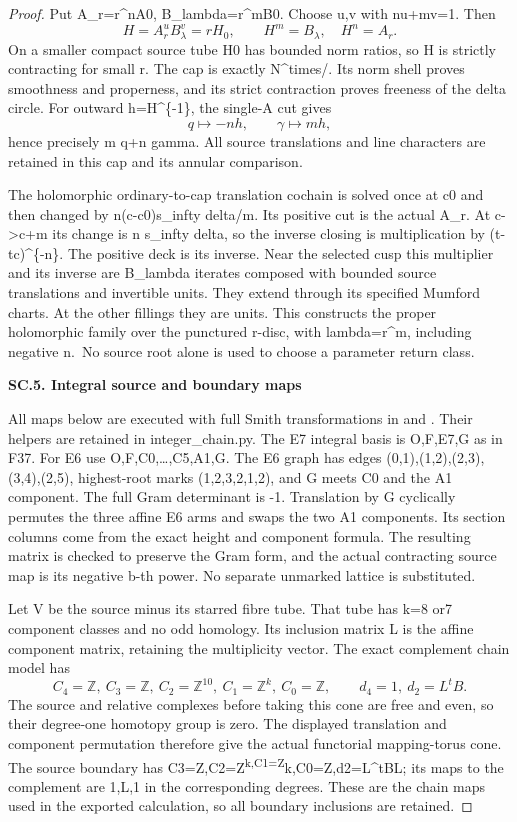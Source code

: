 \begin{proof}
Put A\_r=r\^{}nA0, B\_lambda=r\^{}mB0. Choose u,v with nu+mv=1.
Then
\[
 H=A_r^uB_\lambda^v=rH_0,\qquad H^m=B_\lambda,\quad H^n=A_r.
\]
On a smaller compact source tube H0 has bounded norm ratios, so
H is strictly contracting for small \textbar r\textbar. The cap is exactly
N\^{}times/. Its norm shell proves smoothness and properness,
and its strict contraction proves freeness of the delta circle.
For outward h=H\^{}\{-1\}, the single-A cut gives
\[
                         q\mapsto-nh,\qquad\gamma\mapsto mh,
\]
hence precisely m q+n gamma. All source translations and line
characters are retained in this cap and its annular comparison.

The holomorphic ordinary-to-cap translation cochain is solved
once at c0 and then changed by n(c-c0)s\_infty delta/m.
Its positive cut is the actual A\_r. At c-\textgreater c+m its change is
n s\_infty delta, so the inverse closing is multiplication by
(t-tc)\^{}\{-n\}. The positive deck is its inverse. Near the selected
cusp this multiplier and its inverse are B\_lambda iterates
composed with bounded source translations and invertible units.
They extend through its specified Mumford charts. At the other
fillings they are units. This constructs the proper holomorphic
family over the punctured r-disc, with lambda=r\^{}m, including
negative n.~No source root alone is used to choose a parameter
return class.

\par

\medskip\noindent\textbf{SC.5. Integral source and boundary maps}

All maps below are executed with full Smith transformations in
 and
. Their helpers are retained in
integer\_chain.py. The E7 integral basis is O,F,E7,G as in F37.
For E6 use O,F,C0,\ldots,C5,A1,G. The E6 graph has edges
(0,1),(1,2),(2,3),(3,4),(2,5), highest-root marks
(1,2,3,2,1,2), and G meets C0 and the A1 component.
The full Gram determinant is -1. Translation by G cyclically
permutes the three affine E6 arms and swaps the two A1 components.
Its section columns come from the exact height and component
formula. The resulting matrix is checked to preserve the Gram
form, and the actual contracting source map is its negative b-th
power. No separate unmarked lattice is substituted.

Let V be the source minus its starred fibre tube. That tube has
k=8 or7 component classes and no odd homology. Its inclusion
matrix L is the affine component matrix, retaining the multiplicity
vector. The exact complement chain model has
\[
 C_4=\mathbb Z,\ C_3=\mathbb Z,\ C_2=\mathbb Z^{10},\
 C_1=\mathbb Z^k,\ C_0=\mathbb Z,\qquad
 d_4=1,\ d_2=L^tB.
\]
The source and relative complexes before taking this cone are
free and even, so their degree-one homotopy group is zero.
The displayed translation and component permutation therefore
give the actual functorial mapping-torus cone. The source boundary
has C3=Z,C2=Z\textsuperscript{k,C1=Z}k,C0=Z,d2=L\^{}tBL; its maps to the complement
are 1,L,1 in the corresponding degrees. These are the chain maps
used in the exported calculation, so all boundary inclusions are
retained.


\end{proof}
